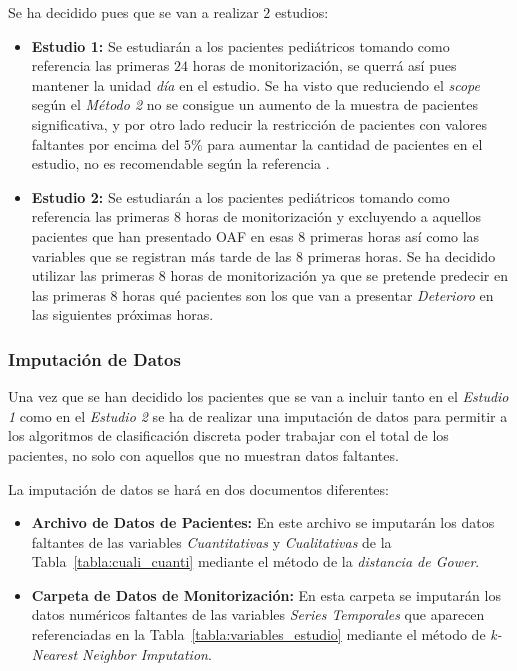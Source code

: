 Se ha decidido pues que se van a realizar $2$ estudios:

\begin{itemize}
    \item \textbf{Estudio 1:} Se estudiarán a los pacientes pediátricos tomando como referencia las primeras $24$ horas de monitorización, se querrá así pues mantener la unidad \textit{día} en el estudio. Se ha visto que reduciendo el \textit{scope} según el \textit{Método 2} no se consigue un aumento de la muestra de pacientes significativa, y por otro lado reducir la restricción de pacientes con valores faltantes por encima del $5\%$ para aumentar la cantidad de pacientes en el estudio, no es recomendable según la referencia \cite{Scheffer2002}.
    \item \textbf{Estudio 2:} Se estudiarán a los pacientes pediátricos tomando como referencia las primeras $8$ horas de monitorización y excluyendo a aquellos pacientes que han presentado OAF en esas 8 primeras horas así como las variables que se registran más tarde de las $8$ primeras horas. Se ha decidido utilizar las primeras $8$ horas de monitorización ya que se pretende predecir en las primeras $8$ horas qué pacientes son los que van a presentar \textit{Deterioro} en las siguientes próximas horas.
\end{itemize}

\newpage
\subsubsection{Imputación de Datos}\label{sec:imputacion-de-datos}

Una vez que se han decidido los pacientes que se van a incluir tanto en el \textit{Estudio 1} como en el \textit{Estudio 2} se ha de realizar una imputación de datos para permitir a los algoritmos de clasificación discreta poder trabajar con el total de los pacientes, no solo con aquellos que no muestran datos faltantes. 

La imputación de datos se hará en dos documentos diferentes:
\begin{itemize}
    \item \textbf{Archivo de Datos de Pacientes:} En este archivo se imputarán los datos faltantes de las variables \textit{Cuantitativas} y \textit{Cualitativas} de la Tabla~\ref{tabla:cuali_cuanti} mediante el método de la \textit{distancia de Gower}.
    \item \textbf{Carpeta de Datos de Monitorización:} En esta carpeta se imputarán los datos numéricos faltantes de las variables \textit{Series Temporales} que aparecen referenciadas en la Tabla~\ref{tabla:variables_estudio} mediante el método de \textit{k-Nearest Neighbor Imputation}.
\end{itemize}

